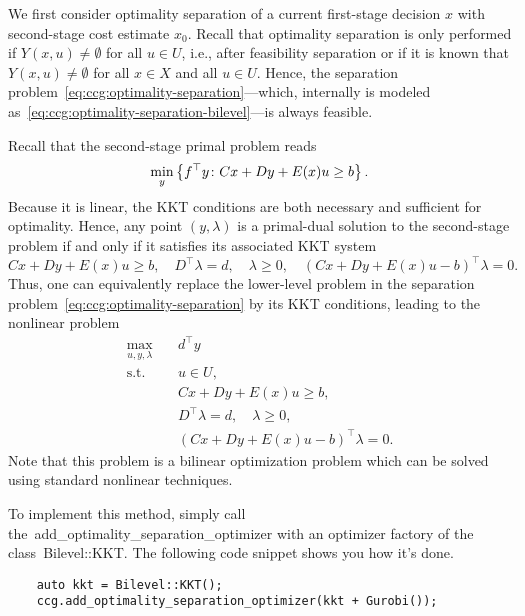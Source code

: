 We first consider optimality separation of a current first-stage decision $x$
with second-stage cost estimate $x_0$. Recall that optimality separation is
only performed if $Y(x,u) \neq \emptyset$ for all $u\in U$, i.e., after
feasibility separation or if it is known that $Y(x,u) \neq\emptyset$ for all
$x\in X$ and all $u\in U$. Hence, the separation
problem~\eqref{eq:ccg:optimality-separation}---which, internally is modeled
as~\eqref{eq:ccg:optimality-separation-bilevel}---is always feasible.


Recall that the second-stage primal problem reads
\begin{equation*}
    \min_y\left\{ f^\top y \colon Cx + Dy + E(x)u \ge b \right\}.
\end{equation*}
Because it is linear, the KKT conditions are both necessary and sufficient for
optimality. Hence, any point $(y,\lambda)$ is a primal-dual solution to the
second-stage problem if and only if it satisfies its associated KKT system
\begin{equation*}
    Cx + Dy + E(x)u \ge b, \quad 
    D^\top \lambda = d, \quad 
    \lambda\ge 0, \quad
    (Cx + Dy + E(x)u - b)^\top \lambda = 0.
\end{equation*}
Thus, one can equivalently replace the lower-level problem in the separation
problem~\eqref{eq:ccg:optimality-separation} by its KKT conditions, leading to
the nonlinear problem
\begin{subequations}
    \begin{align}
        \max_{u,y,\lambda} \quad & d^\top y \\
        \text{s.t.} \quad & u\in U, \\
        & Cx + Dy + E(x)u \ge b, \\ 
        & D^\top \lambda = d, \quad \lambda\ge 0, \\
        & (Cx + Dy + E(x)u - b)^\top \lambda = 0. \label{eq:ccg:kkt}
    \end{align}
\end{subequations}
Note that this problem is a bilinear optimization problem which can be solved
using standard nonlinear techniques.

To implement this method, simply call
the~\textsf{add\_optimality\_separation\_optimizer} with an optimizer factory
of the class~\textsf{Bilevel::KKT}. The following code snippet shows you how
it's done.
%
\begin{lstlisting}
    auto kkt = Bilevel::KKT();
    ccg.add_optimality_separation_optimizer(kkt + Gurobi());
\end{lstlisting}

